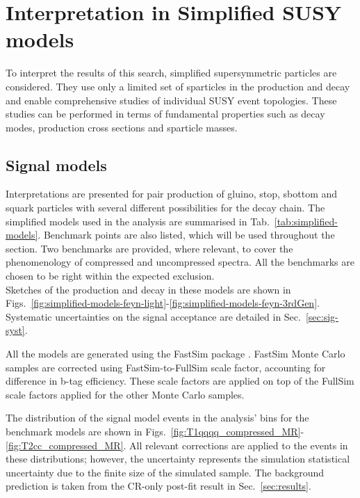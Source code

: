 \section{Interpretation in Simplified SUSY models}
\label{sec:susy}

To interpret the results of this search, simplified
supersymmetric particles are considered.  They use only a limited set
of sparticles in the production and decay and enable comprehensive
studies of individual SUSY event topologies. These studies can be
performed in terms of fundamental properties such as decay modes,
production cross sections and sparticle masses.

\subsection{Signal models}
\label{sec:susy_models}
Interpretations are presented for pair production of gluino, stop, sbottom and
squark particles with several different possibilities for the decay
chain. The simplified models used in the analysis are summarised in
Tab.~\ref{tab:simplified-models}. Benchmark points are also listed, which will
be used throughout the section. Two benchmarks are provided, where relevant,
to cover the phenomenology of compressed and uncompressed spectra. All the
benchmarks are chosen to be right within the expected exclusion. \\

Sketches of the production and decay in these models are shown in
Figs.~\ref{fig:simplified-models-feyn-light}-\ref{fig:simplified-models-feyn-3rdGen}.
Systematic uncertainties on the signal acceptance are detailed in
Sec.~\ref{sec:sig-syst}.

All the models are generated using the FastSim package
\cite{Abdullin:2011zz}.  FastSim Monte Carlo samples are corrected
using FastSim-to-FullSim scale factor, accounting for difference in
b-tag efficiency. These scale factors are applied on top of the
FullSim scale factors applied for the other Monte Carlo samples.

The distribution of the signal model events in the analysis' bins for the
benchmark models are shown in Figs.~\ref{fig:T1qqqq_compressed_MR}-\ref{fig:T2cc_compressed_MR}.
All relevant corrections are applied to the events in these distributions;
however, the uncertainty represents the simulation statistical uncertainty due
to the finite size of the simulated sample. The background prediction is taken
from the CR-only post-fit result in Sec.~\ref{sec:results}.

